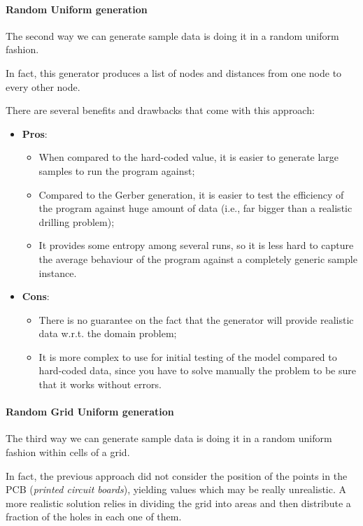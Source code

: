\paragraph{Random Uniform generation} The second way we can generate sample data
is doing it in a random uniform fashion.

In fact, this generator produces a list of nodes and distances from one node to
every other node.

There are several benefits and drawbacks that come with this approach:

\begin{itemize}
  \item \textbf{Pros}:
  \begin{itemize}
    \item When compared to the hard-coded value, it is easier to generate large
      samples to run the program against;
    \item Compared to the Gerber generation, it is easier to test the
		  efficiency of the program against huge amount of data (i.e., far bigger
			than a realistic drilling problem);
    \item It provides some entropy among several runs, so it is less hard to
      capture the average behaviour of the program against a completely generic
      sample instance.
  \end{itemize}
  \item \textbf{Cons}:
  \begin{itemize}
    \item There is no guarantee on the fact that the generator will provide
      realistic data w.r.t. the domain problem;
    \item It is more complex to use for initial testing of the model compared
      to hard-coded data, since you have to solve manually the problem to be
      sure that it works without errors.
  \end{itemize}
\end{itemize}

\paragraph{Random Grid Uniform generation} The third way we can generate sample
data is doing it in a random uniform fashion within cells of a grid.

In fact, the previous approach did not consider the position of the points in
the PCB (\textit{printed circuit boards}), yielding values which may be really
unrealistic. A more realistic solution relies in dividing the grid into areas
and then distribute a fraction of the holes in each one of them.

